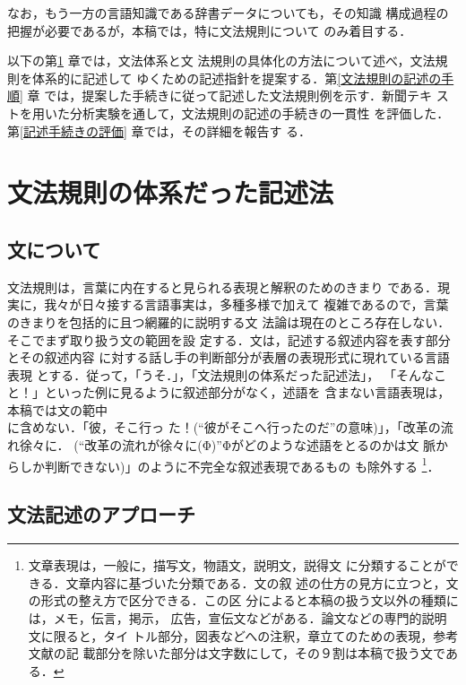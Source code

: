 なお，もう一方の言語知識である辞書データについても，その知識
構成過程の把握が必要であるが，本稿では，特に文法規則について
のみ着目する．


以下の第\ref{文法規則の体系だった記述法} 章では，文法体系と文
法規則の具体化の方法について述べ，文法規則を体系的に記述して
ゆくための記述指針を提案する．第\ref{文法規則の記述の手順} 章
では，提案した手続きに従って記述した文法規則例を示す．新聞テキ
ストを用いた分析実験を通して，文法規則の記述の手続きの一貫性
を評価した．第\ref{記述手続きの評価} 章では，その詳細を報告す
る．

\section{文法規則の体系だった記述法}
\label{文法規則の体系だった記述法}

\subsection{文について}

文法規則は，言葉に内在すると見られる表現と解釈のためのきまり
である．現実に，我々が日々接する言語事実は，多種多様で加えて
複雑であるので，言葉のきまりを包括的に且つ網羅的に説明する文
法論は現在のところ存在しない．そこでまず取り扱う文の範囲を設
定する．{\dg 文}は，記述する叙述内容を表す部分とその叙述内容
に対する話し手の判断部分が表層の表現形式に現れている言語表現
とする．従って，「うそ．」，「文法規則の体系だった記述法」，
「そんなこと！」といった例に見るように叙述部分がなく，述語を
含まない言語表現は，本稿では文の範中\\に含めない．「彼，そこ行っ
た！(``彼がそこへ行ったのだ''の意味)」，「改革の流れ徐々に．
(``改革の流れが徐々に(Φ)''Φがどのような述語をとるのかは文
脈からしか判断できない)」のように不完全な叙述表現であるもの
も除外する
\footnote{文章表現は，一般に，描写文，物語文，説明文，説得文
に分類することができる．文章内容に基づいた分類である．文の叙
述の仕方の見方に立つと，文の形式の整え方で区分できる．この区
分によると本稿の扱う{\dg 文}以外の種類には，メモ，伝言，掲示，
広告，宣伝文などがある．論文などの専門的説明文に限ると，タイ
トル部分，図表などへの注釈，章立てのための表現，参考文献の記
載部分を除いた部分は文字数にして，その９割は本稿で扱う文であ
る．}．

\vspace*{-0.5mm}
\subsection{文法記述のアプローチ}


